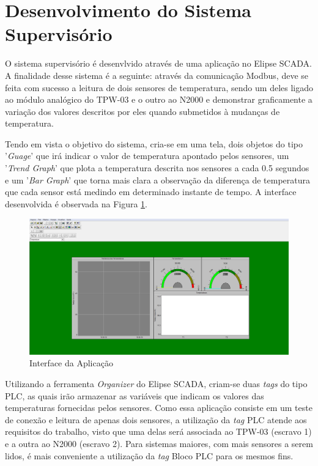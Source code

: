 \label{Cap:aplicacaoTestes}

\section{Desenvolvimento do Sistema Supervisório}

O sistema supervisório é desenvlvido através de uma aplicação no Elipse SCADA. A finalidade desse sistema é a seguinte: através da comunicação Modbus, deve se feita com sucesso a leitura de dois sensores de temperatura, sendo um deles ligado ao módulo analógico do TPW-03 e o outro ao N2000 e demonstrar graficamente a variação dos valores descritos por eles quando submetidos à mudanças de temperatura. 

Tendo em vista o objetivo do sistema, cria-se em uma tela, dois objetos do tipo '\textit{Guage}' que irá indicar o valor de temperatura apontado pelos sensores, um '\textit{Trend Graph}' que plota a temperatura descrita nos sensores a cada 0.5 segundos e um '\textit{Bar Graph}' que torna mais clara a observação da diferença de temperatura que cada sensor está medindo em determinado instante de tempo. A interface desenvolvida é observada na Figura \ref{fig:Interface}.

\begin{figure}[h!]
\centering
\includegraphics[scale=0.29]{Interface.png}
\caption{Interface da Aplicação}
\label{fig:Interface}
\end{figure}

Utilizando a ferramenta \textit{Organizer} do Elipse SCADA, criam-se duas \textit{tags} do tipo PLC, as quais irão armazenar as variáveis que indicam os valores das temperaturas fornecidas pelos sensores. Como essa aplicação consiste em um teste de conexão e leitura de apenas dois sensores, a utilização da \textit{tag} PLC atende aos requisitos do trabalho, visto que uma delas será associada ao TPW-03 (escravo 1) e a outra ao N2000 (escravo 2). Para sistemas maiores, com mais sensores a serem lidos, é mais conveniente a utilização da \textit{tag} Bloco PLC para os mesmos fins.

